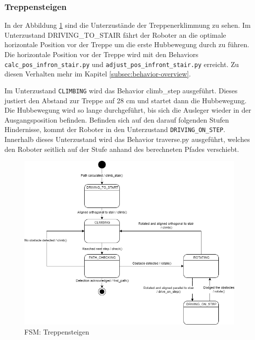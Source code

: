 \newpage

\subsubsection{Treppensteigen}
\label{subsubsec:treppensteigen}
In der Abbildung \ref{fig:fsm-stair-climbing} sind die Unterzustände der Treppenerklimmung zu sehen. Im Unterzustand DRIVING\_TO\_STAIR fährt der Roboter an die optimale horizontale Position vor der Treppe um die erste Hubbewegung durch zu führen. Die horizontale Position vor der Treppe wird mit den Behaviors \texttt{calc\_pos\_infron\_stair.py} und \texttt{adjust\_pos\_infront\_stair.py} erreicht. Zu diesen Verhalten mehr im Kapitel \ref{subsec:behavior-overview}.

Im Unterzustand \texttt{CLIMBING} wird das Behavior climb\_step ausgeführt. Dieses justiert den Abstand zur Treppe auf 28 cm und startet dann die Hubbewegung. Die Hubbewegung wird so lange durchgeführt, bis sich die Ausleger wieder in der Ausgangsposition befinden. Befinden sich auf den darauf folgenden Stufen Hindernisse, kommt der Roboter in den Unterzustand \texttt{DRIVING\_ON\_STEP}. Innerhalb dieses Unterzustand wird das Behavior traverse.py ausgeführt, welches den Roboter seitlich auf der Stufe anhand des berechneten Pfades verschiebt.

\begin{figure}[H]
  \includegraphics[width=1\textwidth]{img/softwarearchitektur/FSM-STAIR_CLIMBING.png}
  \centering
  \caption{FSM: Treppensteigen}
  \label{fig:fsm-stair-climbing}
\end{figure}

